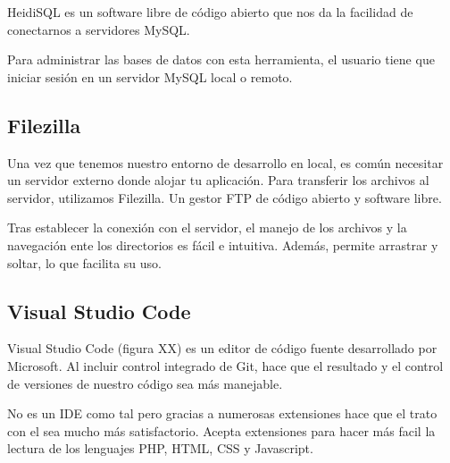 HeidiSQL es un software libre de código abierto que nos da la facilidad de conectarnos a servidores MySQL.

Para administrar las bases de datos con esta herramienta, el usuario tiene que iniciar sesión en un servidor MySQL local o remoto. 


\subsection{Filezilla}

Una vez que tenemos nuestro entorno de desarrollo en local, es común necesitar un servidor externo donde alojar tu aplicación. Para transferir los archivos al servidor, utilizamos Filezilla. Un gestor FTP de código abierto y software libre.

Tras establecer la conexión con el servidor, el manejo de los archivos y la navegación ente los directorios es fácil e intuitiva. Además, permite arrastrar y soltar, lo que facilita su uso.


\subsection{Visual Studio Code}

Visual Studio Code (figura XX) es un editor de código fuente desarrollado por Microsoft. Al incluir control integrado de Git, hace que el resultado y el control de versiones de nuestro código sea más manejable.

No es un IDE como tal pero gracias a numerosas extensiones hace que el trato con el sea mucho más satisfactorio. Acepta extensiones para hacer más facil la lectura de los lenguajes PHP, HTML, CSS y Javascript. 


